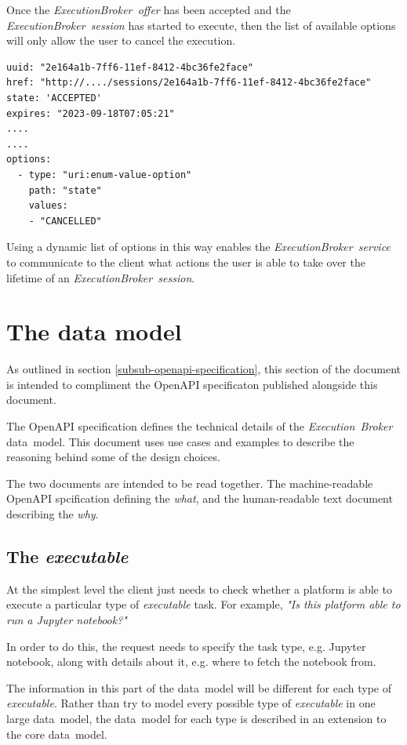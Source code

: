 \documentclass[11pt,a4paper]{ivoa}
\newcommand{\openapi} {OpenAPI}
\newcommand{\datamodel} {data~model}
\newcommand{\execbrokerservice}[1] {\textit{ExecutionBroker~service#1}}
\newcommand{\execoffer}[1] {\textit{ExecutionBroker~offer#1}}
\newcommand{\execsession}[1] {\textit{ExecutionBroker~session#1}}
\newcommand{\executionbroker} {\textit{Execution~Broker}}
\newcommand{\executable} {\textit{executable}}
\newcommand{\excutabletask} {\textit{executable} task}
\newcommand{\jupyternotebook} {Jupyter notebook}
\begin{document}
Once the \execoffer{} has been accepted and the \execsession{} has started to
execute, then the list of available options will only allow the user to cancel
the execution.

\begin{lstlisting}[]
uuid: "2e164a1b-7ff6-11ef-8412-4bc36fe2face"
href: "http://..../sessions/2e164a1b-7ff6-11ef-8412-4bc36fe2face"
state: 'ACCEPTED'
expires: "2023-09-18T07:05:21"
....
....
options:
  - type: "uri:enum-value-option"
    path: "state"
    values:
    - "CANCELLED"
\end{lstlisting}

Using a dynamic list of options in this way enables the \execbrokerservice{}
to communicate to the client what actions the user is able to take
over the lifetime of an \execsession{}.

\section{The data model}
\label{sect-data-model}

As outlined in section \ref{subsub-openapi-specification}, this section of the document is
intended to compliment the \openapi{} specificaton published alongside this document.

The \openapi{} specification defines the technical details of the
\executionbroker{} \datamodel{}.
This document uses use cases and examples to describe the reasoning
behind some of the design choices.

The two documents are intended to be read together.
The machine-readable \openapi{} spcification defining the \textit{what},
and the human-readable text document describing the \textit{why}.

\subsection{The \executable{}}
\label{sub-executable}

At the simplest level the client just needs to check whether a platform is able to execute a particular
type of \excutabletask{}.
For example, \textit{"Is this platform able to run a \jupyternotebook{}?"}

In order to do this, the request needs to specify the task type, e.g. \jupyternotebook{},
along with details about it, e.g. where to fetch the notebook from.

The information in this part of the \datamodel{} will be different for each type of \executable{}.
Rather than try to model every possible type of \executable{} in one large \datamodel{},
the \datamodel{} for each type is described in an extension to the core \datamodel{}.
\end{document}
